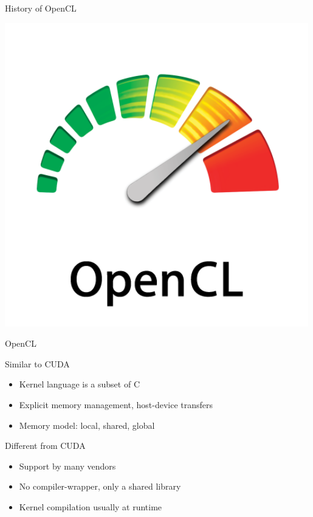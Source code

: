 \begin{frame}{History of OpenCL}
\begin{minipage}{0.7\textwidth}
\end{minipage} \hfill
\begin{minipage}{0.25\textwidth}
 \includegraphics[width=0.99\textwidth]{figures/opencl.jpg}
 
 \vspace*{5cm}
\end{minipage}


\end{frame}


\begin{frame}{OpenCL}

\begin{block}{Similar to CUDA}
  \begin{itemize}
   \item Kernel language is a subset of C
   \item Explicit memory management, host-device transfers
   \item Memory model: local, shared, global
  \end{itemize}
\end{block}


\begin{block}{Different from CUDA}
  \begin{itemize}
   \item Support by many vendors
   \item No compiler-wrapper, only a shared library
   \item Kernel compilation usually at runtime
  \end{itemize}
\end{block}

\end{frame}

